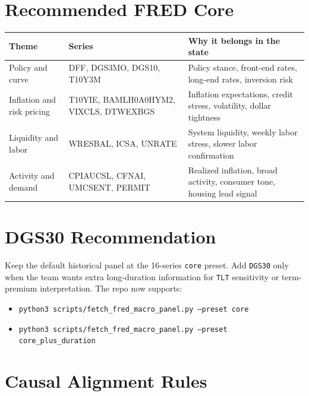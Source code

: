 \documentclass[11pt,a4paper]{article}
\begin{document}
            \section{Recommended FRED Core}

            \begin{tabularx}{\textwidth}{@{}p{}p{}Y@{}}
            \toprule
            \textbf{Theme} & \textbf{Series} & \textbf{Why it belongs in the state} \\
            \midrule
            Policy and curve & DFF, DGS3MO, DGS10, T10Y3M & Policy stance, front-end rates, long-end rates, inversion risk \\
Inflation and risk pricing & T10YIE, BAMLH0A0HYM2, VIXCLS, DTWEXBGS & Inflation expectations, credit stress, volatility, dollar tightness \\
Liquidity and labor & WRESBAL, ICSA, UNRATE & System liquidity, weekly labor stress, slower labor confirmation \\
Activity and demand & CPIAUCSL, CFNAI, UMCSENT, PERMIT & Realized inflation, broad activity, consumer tone, housing lead signal \\
            \bottomrule
            \end{tabularx}

            \section{DGS30 Recommendation}

            Keep the default historical panel at the 16-series \texttt{core} preset.
            Add \texttt{DGS30} only when the team wants extra long-duration information for \texttt{TLT} sensitivity or term-premium interpretation.
            The repo now supports:

            \begin{itemize}[leftmargin=1.4em]
              \item \texttt{python3 scripts/fetch\_fred\_macro\_panel.py --preset core}
              \item \texttt{python3 scripts/fetch\_fred\_macro\_panel.py --preset core\_plus\_duration}
            \end{itemize}

            \section{Causal Alignment Rules}
\end{document}

